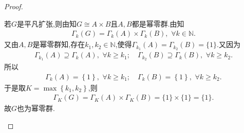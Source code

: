 \documentclass[../../main.tex]{subfiles}%
\begin{document}
\begin{proof}
\begin{enumerate}[(1)]
若$G$是平凡扩张,则由知$G \cong A \times B$且$A, B$都是幂零群.由知
\begin{align*}
\Gamma_k(G) = \Gamma_k(A) \times \Gamma_k(B),\,\,\forall k\in \mathbb{N}.
\end{align*}
又由$A, B$是幂零群知,存在$k_1,k_2\in \mathbb{N}$,使得$\Gamma_{k_1}(A)=\Gamma_{k_2}(B)=\{1\}$.又因为
\begin{align*}
\Gamma _{k_1}(A)\supseteq \Gamma _k(A),\,\,\forall k\geqslant k_1;\quad \Gamma _{k_2}(B)\supseteq \Gamma _k(B),\,\,\forall k\geqslant k_2.
\end{align*}
所以
\begin{align*}
\Gamma _k\left( A \right) =\left\{ 1 \right\} ,\,\,\forall k\geqslant k_1;\quad \Gamma _k\left( B \right) =\left\{ 1 \right\} ,\,\,\forall k\geqslant k_2.
\end{align*}
于是取$K=\max \left\{ k_1,k_2 \right\} $,则
\begin{align*}
\Gamma_K(G)=\Gamma_K(A)\times \Gamma_K(B)=\{1\}\times\{1\}=\{1\}.
\end{align*}
故$G$也为幂零群.
\end{enumerate}
\end{proof}
\end{document}

